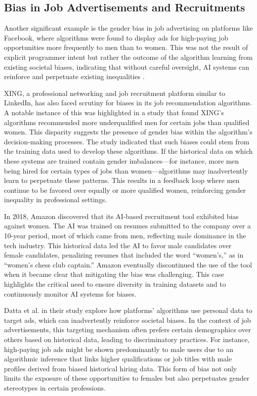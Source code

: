 \subsection{Bias in Job Advertisements and Recruitments}
Another significant example is the gender bias in job advertising on platforms like Facebook, where algorithms were found to display ads for high-paying job opportunities more frequently to men than to women. This was not the result of explicit programmer intent but rather the outcome of the algorithm learning from existing societal biases, indicating that without careful oversight, AI systems can reinforce and perpetuate existing inequalities \cite{Lambrecht_Tucker_2019}.

XING, a professional networking and job recruitment platform similar to LinkedIn, has also faced scrutiny for biases in its job recommendation algorithms. A notable instance of this was highlighted in a study that found XING's algorithms recommended more underqualified men for certain jobs than qualified women. This disparity suggests the presence of gender bias within the algorithm's decision-making processes. The study indicated that such biases could stem from the training data used to develop these algorithms. If the historical data on which these systems are trained contain gender imbalances—for instance, more men being hired for certain types of jobs than women—algorithms may inadvertently learn to perpetuate these patterns. This results in a feedback loop where men continue to be favored over equally or more qualified women, reinforcing gender inequality in professional settings.\cite{Lahoti_Gummadi_Weikum_2019}

In 2018, Amazon discovered that its AI-based recruitment tool exhibited bias against women. The AI was trained on resumes submitted to the company over a 10-year period, most of which came from men, reflecting male dominance in the tech industry. This historical data led the AI to favor male candidates over female candidates, penalizing resumes that included the word “women’s,” as in “women’s chess club captain.” Amazon eventually discontinued the use of the tool when it became clear that mitigating the bias was challenging. This case highlights the critical need to ensure diversity in training datasets and to continuously monitor AI systems for biases.\cite{Dastin_2018}

Datta et al. \cite{datta_automated_2015} in their study explore how platforms' algorithms use personal data to target ads, which can inadvertently reinforce societal biases. In the context of job advertisements, this targeting mechanism often prefers certain demographics over others based on historical data, leading to discriminatory practices. For instance, high-paying job ads might be shown predominantly to male users due to an algorithmic inference that links higher qualifications or job titles with male profiles derived from biased historical hiring data. This form of bias not only limits the exposure of these opportunities to females but also perpetuates gender stereotypes in certain professions.

